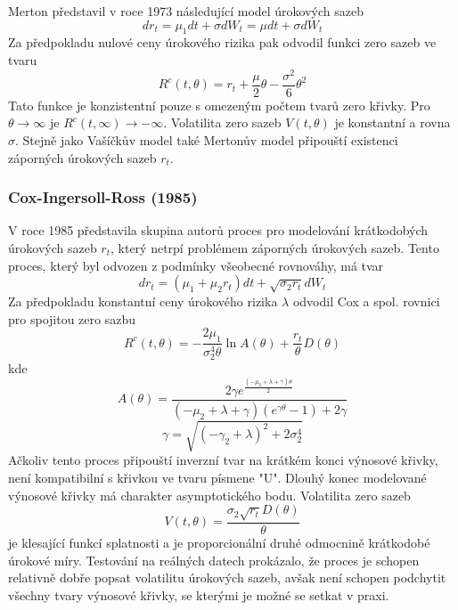 \documentclass[a4paper]{book}
\begin{document}
Merton představil v roce 1973 následující model úrokových sazeb
\begin{equation*}
dr_t = \mu_1 dt + \sigma d W_t = \mu dt + \sigma dW_t
\end{equation*}
Za předpokladu nulové ceny úrokového rizika pak odvodil funkci zero sazeb ve tvaru
\begin{equation*}
R^c(t, \theta) = r_t + \frac{\mu}{2}\theta - \frac{\sigma^2}{6}\theta^2
\end{equation*}
Tato funkce je konzistentní pouze s omezeným počtem tvarů zero křivky. Pro $\theta \rightarrow \infty$ je $R^c(t, \infty) \rightarrow -\infty$. Volatilita zero sazeb $V(t, \theta)$ je konstantní a rovna $\sigma$. Stejně jako Vašíčkův model také Mertonův model připouští existenci záporných úrokových sazeb $r_t$.

\subsubsection{Cox-Ingersoll-Ross (1985)}

V roce 1985 představila skupina autorů proces pro modelování krátkodobých úrokových sazeb $r_t$, který netrpí problémem záporných úrokových sazeb. Tento proces, který byl odvozen z podmínky všeobecné rovnováhy, má tvar
\begin{equation*}
d r_t = (\mu_1 + \mu_2 r_t) dt + \sqrt{\sigma_2 r_t} d W_t
\end{equation*}
Za předpokladu konstantní ceny úrokového rizika $\lambda$ odvodil Cox a spol. rovnici pro spojitou zero sazbu
\begin{equation*}
R^c(t, \theta) = - \frac{2 \mu_1}{\sigma_2^4 \theta} \ln A(\theta) + \frac{r_t}{\theta} D(\theta)
\end{equation*}
kde
\begin{equation*}
A(\theta) = \frac{2 \gamma e^{\frac{(-\mu_2 + \lambda + \gamma)\theta}{2}}}{(-\mu_2 + \lambda + \gamma)(e^{\gamma \theta}-1) + 2 \gamma}
\end{equation*}
\begin{equation*}
\gamma = \sqrt{(-\gamma_2 + \lambda)^2 + 2 \sigma_2^4}
\end{equation*}
Ačkoliv tento proces připouští inverzní tvar na krátkém konci výnosové křivky, není kompatibilní s křivkou ve tvaru písmene "U". Dlouhý konec modelované výnosové křivky má charakter asymptotického bodu. Volatilita zero sazeb
\begin{equation*}
V(t, \theta) = \frac{\sigma_2 \sqrt{r_t}D(\theta)}{\theta}
\end{equation*}
je klesající funkcí splatnosti a je proporcionální druhé odmocnině krátkodobé úrokové míry. Testování na reálných datech prokázalo, že proces je schopen relativně dobře popsat volatilitu úrokových sazeb, avšak není schopen podchytit všechny tvary výnosové křivky, se kterými je možné se setkat v praxi.
\end{document}
